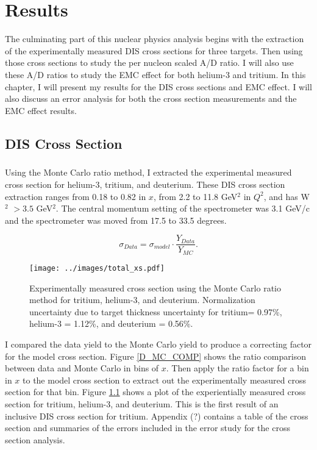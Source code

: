 
\chapter{Results}
The culminating part of this nuclear physics analysis begins with the extraction of the experimentally measured DIS cross sections for three targets. Then using those cross sections to study the per nucleon scaled A/D ratio. I will also use these A/D ratios to study the EMC effect for both helium-3 and tritium. In this chapter, I will present my results for the DIS cross sections and EMC effect. I will also discuss an error analysis for both the cross section measurements and the EMC effect results. 
\section{DIS Cross Section}
\paragraph{}Using the Monte Carlo ratio method, I extracted the experimental measured cross section for helium-3, tritium, and deuterium. These DIS cross section extraction ranges from 0.18 to 0.82 in $x$, from 2.2 to 11.8 GeV$^2$ in $Q^2$, and has W$^2$ $>3.5$ GeV$^2$. The central momentum setting of the spectrometer was 3.1 GeV/c and the spectrometer was moved from 17.5 to 33.5 degrees.


\begin{equation}
\sigma_{Data} = \sigma_{model} \cdot \frac{Y_{Data}}{Y_{MC}}. \nonumber
\end{equation}
\begin{figure}
	\texttt{[image: ../images/total\_xs.pdf]}
	\caption{Experimentally measured cross section using the Monte Carlo ratio method for tritium, helium-3, and deuterium. Normalization uncertainty due to target thickness uncertainty for tritium= 0.97\%, helium-3 = 1.12\%, and deuterium = 0.56\%.}
    \label{CCplot}
\end{figure}
I compared the data yield to the Monte Carlo yield to produce a correcting factor for the model cross section. Figure \ref{D_MC_COMP} shows the ratio comparison between data and Monte Carlo in bins of $x$. Then apply the ratio factor for a bin in $x$ to the model cross section to extract out the experimentally measured cross section for that bin. Figure \ref{CCplot} shows a plot of the experientially measured cross section for tritium, helium-3, and deuterium.  This is the first result of an inclusive DIS cross section for tritium.  Appendix (?) contains a table of the cross section and summaries of the errors included in the error study for the cross section analysis. 
